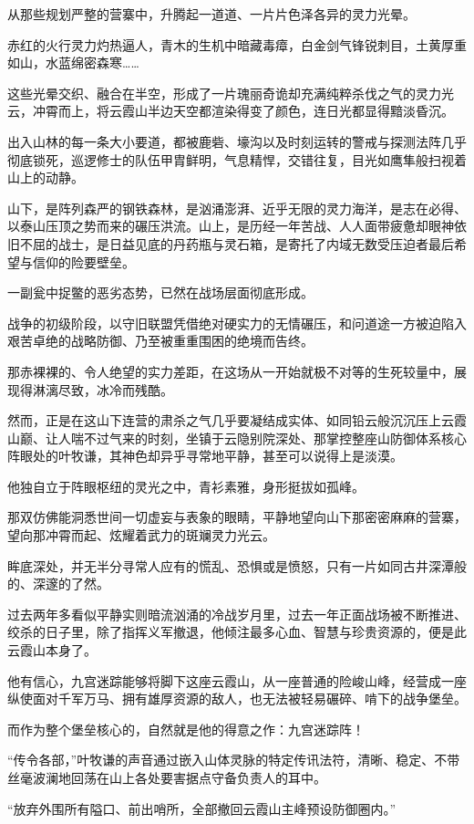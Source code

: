从那些规划严整的营寨中，升腾起一道道、一片片色泽各异的灵力光晕。

赤红的火行灵力灼热逼人，青木的生机中暗藏毒瘴，白金剑气锋锐刺目，土黄厚重如山，水蓝绵密森寒……

这些光晕交织、融合在半空，形成了一片瑰丽奇诡却充满纯粹杀伐之气的灵力光云，冲霄而上，将云霞山半边天空都渲染得变了颜色，连日光都显得黯淡昏沉。

出入山林的每一条大小要道，都被鹿砦、壕沟以及时刻运转的警戒与探测法阵几乎彻底锁死，巡逻修士的队伍甲胄鲜明，气息精悍，交错往复，目光如鹰隼般扫视着山上的动静。

山下，是阵列森严的钢铁森林，是汹涌澎湃、近乎无限的灵力海洋，是志在必得、以泰山压顶之势而来的碾压洪流。山上，是历经一年苦战、人人面带疲惫却眼神依旧不屈的战士，是日益见底的丹药瓶与灵石箱，是寄托了内域无数受压迫者最后希望与信仰的险要壁垒。

一副瓮中捉鳖的恶劣态势，已然在战场层面彻底形成。

战争的初级阶段，以守旧联盟凭借绝对硬实力的无情碾压，和问道途一方被迫陷入艰苦卓绝的战略防御、乃至被重重围困的绝境而告终。

那赤裸裸的、令人绝望的实力差距，在这场从一开始就极不对等的生死较量中，展现得淋漓尽致，冰冷而残酷。

然而，正是在这山下连营的肃杀之气几乎要凝结成实体、如同铅云般沉沉压上云霞山巅、让人喘不过气来的时刻，坐镇于云隐别院深处、那掌控整座山防御体系核心阵眼处的叶牧谦，其神色却异乎寻常地平静，甚至可以说得上是淡漠。

他独自立于阵眼枢纽的灵光之中，青衫素雅，身形挺拔如孤峰。

那双仿佛能洞悉世间一切虚妄与表象的眼睛，平静地望向山下那密密麻麻的营寨，望向那冲霄而起、炫耀着武力的斑斓灵力光云。

眸底深处，并无半分寻常人应有的慌乱、恐惧或是愤怒，只有一片如同古井深潭般的、深邃的了然。

过去两年多看似平静实则暗流汹涌的冷战岁月里，过去一年正面战场被不断推进、绞杀的日子里，除了指挥义军撤退，他倾注最多心血、智慧与珍贵资源的，便是此云霞山本身了。

他有信心，九宫迷踪能够将脚下这座云霞山，从一座普通的险峻山峰，经营成一座纵使面对千军万马、拥有雄厚资源的敌人，也无法被轻易碾碎、啃下的战争堡垒。

而作为整个堡垒核心的，自然就是他的得意之作：九宫迷踪阵！

“传令各部，”叶牧谦的声音通过嵌入山体灵脉的特定传讯法符，清晰、稳定、不带丝毫波澜地回荡在山上各处要害据点守备负责人的耳中。

“放弃外围所有隘口、前出哨所，全部撤回云霞山主峰预设防御圈内。”

